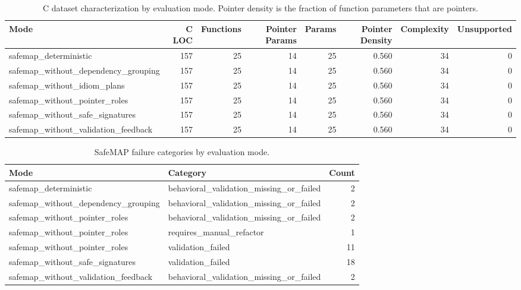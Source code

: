 \begin{table}[t]
\centering
\caption{C dataset characterization by evaluation mode. Pointer density is the fraction of function parameters that are pointers.}
\label{tab:safemap-dataset-characterization}
\begin{tabular}{lrrrrrrr}
\hline
Mode & C LOC & Functions & Pointer Params & Params & Pointer Density & Complexity & Unsupported \\
\hline
safemap\_deterministic & 157 & 25 & 14 & 25 & 0.560 & 34 & 0 \\
safemap\_without\_dependency\_grouping & 157 & 25 & 14 & 25 & 0.560 & 34 & 0 \\
safemap\_without\_idiom\_plans & 157 & 25 & 14 & 25 & 0.560 & 34 & 0 \\
safemap\_without\_pointer\_roles & 157 & 25 & 14 & 25 & 0.560 & 34 & 0 \\
safemap\_without\_safe\_signatures & 157 & 25 & 14 & 25 & 0.560 & 34 & 0 \\
safemap\_without\_validation\_feedback & 157 & 25 & 14 & 25 & 0.560 & 34 & 0 \\
\hline
\end{tabular}
\end{table}

\begin{table}[t]
\centering
\caption{SafeMAP failure categories by evaluation mode.}
\label{tab:safemap-failure-summary}
\begin{tabular}{llr}
\hline
Mode & Category & Count \\
\hline
safemap\_deterministic & behavioral\_validation\_missing\_or\_failed & 2 \\
safemap\_without\_dependency\_grouping & behavioral\_validation\_missing\_or\_failed & 2 \\
safemap\_without\_pointer\_roles & behavioral\_validation\_missing\_or\_failed & 2 \\
safemap\_without\_pointer\_roles & requires\_manual\_refactor & 1 \\
safemap\_without\_pointer\_roles & validation\_failed & 11 \\
safemap\_without\_safe\_signatures & validation\_failed & 18 \\
safemap\_without\_validation\_feedback & behavioral\_validation\_missing\_or\_failed & 2 \\
\hline
\end{tabular}
\end{table}

